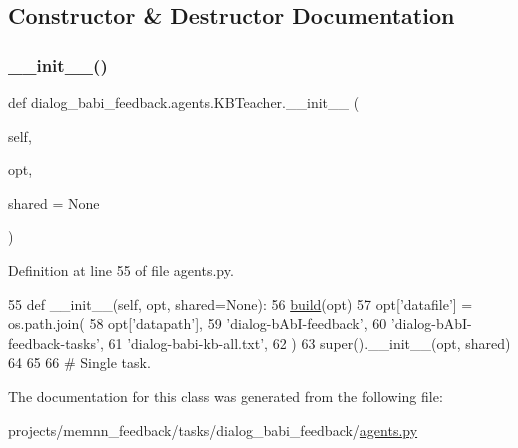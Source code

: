 \subsection{Constructor \& Destructor Documentation}
\mbox{\label{classdialog__babi__feedback_1_1agents_1_1KBTeacher_ad160e36b27da1a5a2d8ff563fb899b09}} 
\subsubsection{\texorpdfstring{\+\_\+\+\_\+init\+\_\+\+\_\+()}{\_\_init\_\_()}}
{\footnotesize\ttfamily def dialog\+\_\+babi\+\_\+feedback.\+agents.\+K\+B\+Teacher.\+\_\+\+\_\+init\+\_\+\+\_\+ (\begin{DoxyParamCaption}\item[{}]{self,  }\item[{}]{opt,  }\item[{}]{shared = {\ttfamily None} }\end{DoxyParamCaption})}



Definition at line 55 of file agents.\+py.


\begin{DoxyCode}
55     \textcolor{keyword}{def }\_\_init\_\_(self, opt, shared=None):
56         \hyperlink{namespaceparlai_1_1mturk_1_1tasks_1_1talkthewalk_1_1download_a8c0fbb9b6dfe127cb8c1bd6e7c4e33fd}{build}(opt)
57         opt[\textcolor{stringliteral}{'datafile'}] = os.path.join(
58             opt[\textcolor{stringliteral}{'datapath'}],
59             \textcolor{stringliteral}{'dialog-bAbI-feedback'},
60             \textcolor{stringliteral}{'dialog-bAbI-feedback-tasks'},
61             \textcolor{stringliteral}{'dialog-babi-kb-all.txt'},
62         )
63         super().\_\_init\_\_(opt, shared)
64 
65 
66 \textcolor{comment}{# Single task.}
\end{DoxyCode}


The documentation for this class was generated from the following file\+:\begin{DoxyCompactItemize}
\item 
projects/memnn\+\_\+feedback/tasks/dialog\+\_\+babi\+\_\+feedback/\hyperlink{projects_2memnn__feedback_2tasks_2dialog__babi__feedback_2agents_8py}{agents.\+py}\end{DoxyCompactItemize}
